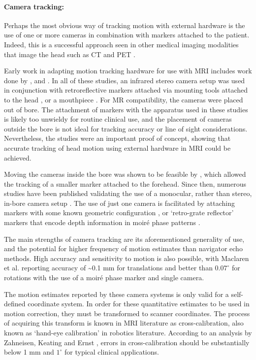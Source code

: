 \documentclass[class=article, crop=false]{standalone}
\begin{document}
\paragraph{Camera tracking:}
Perhaps the most obvious way of tracking motion with external hardware is the use of one or more cameras in combination with markers attached to the patient. Indeed, this is a successful approach seen in other medical imaging modalities that image the head such as CT \parencite{Kim2015,Kim2016} and PET \parencite{Bloomfield2003,Fulton2002}.
\par 
Early work in adapting motion tracking hardware for use with MRI includes work done by \cite{Tremblay2005a}, \cite{Zaitsev2006a} and \cite{Dold2006}. In all of these studies, an infrared stereo camera setup was used in conjunction with retroreflective markers attached via mounting tools attached to the head \parencite{Tremblay2005a}, or a mouthpiece \parencite{Zaitsev2006a,Dold2006}. For MR compatibility, the cameras were placed out of bore. The attachment of markers with the apparatus used in these studies is likely too unwieldy for routine clinical use, and the placement of cameras outside the bore is not ideal for tracking accuracy or line of sight considerations. Nevertheless, the studies were an important proof of concept, showing that accurate tracking of head motion using external hardware in MRI could be achieved.
\par
Moving the cameras inside the bore was shown to be feasible by \cite{Qin2009}, which allowed the tracking of a smaller marker attached to the forehead. Since then, numerous studies have been published validating the use of a monocular, rather than stereo, in-bore camera setup \parencite{Aksoy2011,Aksoy2017,Forman2011,Maclaren2012,Andrews-Shigaki2011,MacLaren2011,Gumus2015a}. The use of just one camera is facilitated by attaching markers with some known geometric configuration \parencite{Forman2011}, or `retro-grate reflector' markers that encode depth information in moiré phase patterns \parencite{Andrews-Shigaki2011}.
\par
The main strengths of camera tracking are its aforementioned generality of use, and the potential for higher frequency of motion estimates than navigator echo methods. High accuracy and sensitivity to motion is also possible, with Maclaren et al. \parencite*{Maclaren2012} reporting accuracy of \~{}0.1 mm for translations and better than $0.07^{\circ}$ for rotations with the use of a moiré phase marker and single camera.
\par
The motion estimates reported by these camera systems is only valid for a self-defined coordinate system. In order for these quantitative estimates to be used in motion correction, they must be transformed to scanner coordinates. The process of acquiring this transform is known in MRI literature as cross-calibration, also known as `hand-eye calibration' in robotics literature. According to an analysis by Zahneisen, Keating and Ernst \parencite*{Zahneisen2014a}, errors in cross-calibration should be substantially below 1 mm and $1^{\circ}$ for typical clinical applications. 
\end{document}
